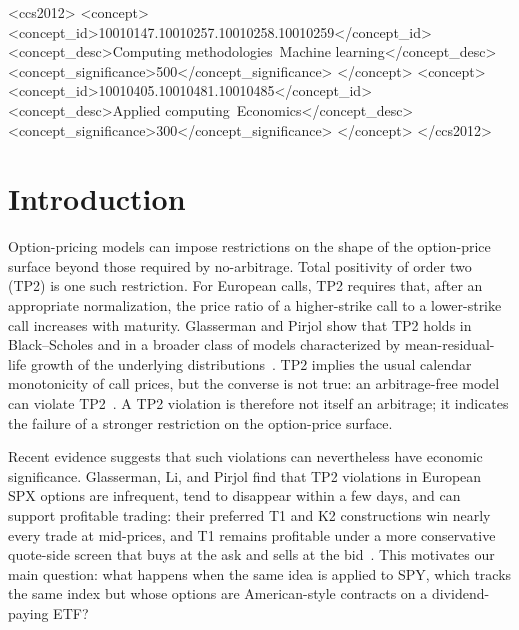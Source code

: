 \documentclass[sigconf,review,anonymous]{acmart}
\begin{document}
\begin{CCSXML}
<ccs2012>
 <concept>
  <concept_id>10010147.10010257.10010258.10010259</concept_id>
  <concept_desc>Computing methodologies~Machine learning</concept_desc>
  <concept_significance>500</concept_significance>
 </concept>
 <concept>
  <concept_id>10010405.10010481.10010485</concept_id>
  <concept_desc>Applied computing~Economics</concept_desc>
  <concept_significance>300</concept_significance>
 </concept>
</ccs2012>
\end{CCSXML}



\maketitle

\section{Introduction}
\label{sec:intro}

Option-pricing models can impose restrictions on the shape of the option-price surface beyond those required by no-arbitrage. Total positivity of order two (TP2) is one such restriction. For European calls, TP2 requires that, after an appropriate normalization, the price ratio of a higher-strike call to a lower-strike call increases with maturity. Glasserman and Pirjol show that TP2 holds in Black--Scholes and in a broader class of models characterized by mean-residual-life growth of the underlying distributions~\cite{glasserman2026tp2theory}. TP2 implies the usual calendar monotonicity of call prices, but the converse is not true: an arbitrage-free model can violate TP2~\cite{glasserman2026tp2theory,glasserman2023convexity}. A TP2 violation is therefore not itself an arbitrage; it indicates the failure of a stronger restriction on the option-price surface.

Recent evidence suggests that such violations can nevertheless have economic significance. Glasserman, Li, and Pirjol find that TP2 violations in European SPX options are infrequent, tend to disappear within a few days, and can support profitable trading: their preferred T1 and K2 constructions win nearly every trade at mid-prices, and T1 remains profitable under a more conservative quote-side screen that buys at the ask and sells at the bid~\cite{glasserman2025tp2}. This motivates our main question: what happens when the same idea is applied to SPY, which tracks the same index but whose options are American-style contracts on a dividend-paying ETF?
\end{document}
